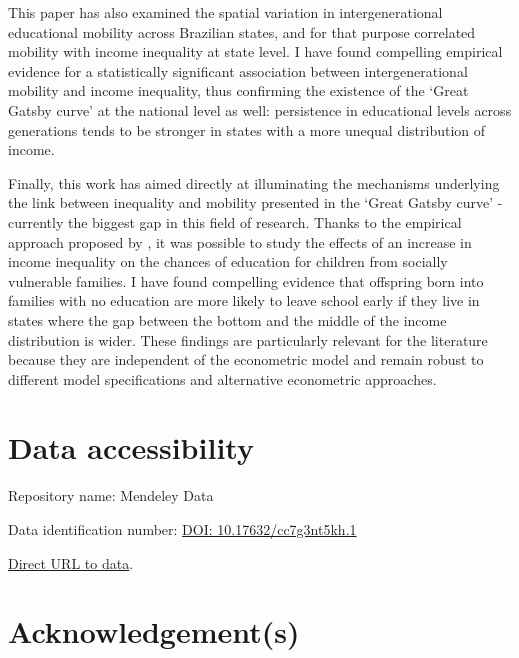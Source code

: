 \documentclass[a4paper, 12pt]{article}
\begin{document}
This paper has also examined the spatial variation in intergenerational educational mobility across Brazilian states, and for that purpose correlated mobility with income inequality at state level. I have found compelling empirical evidence for a statistically significant association between intergenerational mobility and income inequality, thus confirming the existence of the ‘Great Gatsby curve’ at the national level as well: persistence in educational levels across generations tends to be stronger in states with a more unequal distribution of income. 


Finally, this work has aimed directly at illuminating the mechanisms underlying the link between inequality and mobility presented in the ‘Great Gatsby curve’ - currently the biggest gap in this field of research. Thanks to the empirical approach proposed by \citet{kearney2014income}, it was possible to study the effects of an increase in income inequality on the chances of education for children from socially vulnerable families. I have found compelling evidence that offspring born into families with no education are more likely to leave school early if they live in states where the gap between the bottom and the middle of the income distribution is wider. These findings are particularly relevant for the literature because they are independent of the econometric model and remain robust to different model specifications and alternative econometric approaches.



\section*{Data accessibility}

\footnotesize Repository name: Mendeley Data

Data identification number: \href{https://data.mendeley.com/datasets/cc7g3nt5kh/1}{DOI: 10.17632/cc7g3nt5kh.1}

\href{ftp://ftp.ibge.gov.br/Trabalho_e_Rendimento/Pesquisa_Nacional_por_Amostra_de_Domicilios_anual/microdados/2014/}{Direct URL to data}.


\section*{Acknowledgement(s)}
\end{document}
